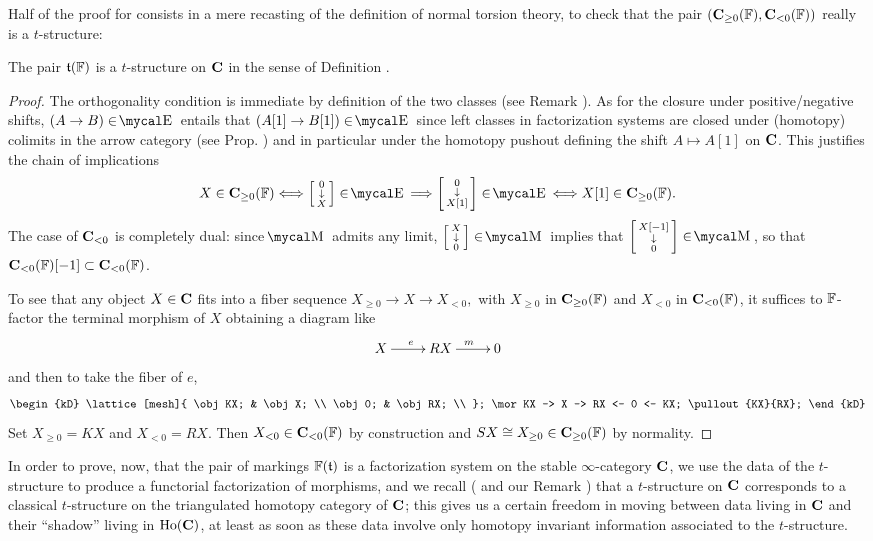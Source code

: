 Half of the proof for \athm {} consists in a mere recasting of the definition of normal torsion theory, to check that the pair $(\textbf{C}_{\ge 0}(\mathbb{F}),\textbf{C}_{<0}(\mathbb{F}))$ really is a $t$\hyp{}structure:
\begin{proposition}
The pair $\mathfrak{t}(\mathbb{F})$ is a $t$\hyp{}structure on $\textbf{C}$ in the sense of Definition .
\end{proposition}
\begin{proof}
The orthogonality condition is immediate by definition of the two classes (see Remark ). As for the closure under positive\fshyp{}negative shifts, $(A\to B)\in\EE$ entails that $(A[1]\to B[1])\in\EE$ since left classes in factorization systems are closed under (homotopy) colimits in the arrow category (see Prop. ) and in particular under the homotopy pushout defining the shift $A\mapsto A[1]$ on $\textbf{C}$. This justifies the chain of implications
\[
X\in \cate C_{\ge 0}(\fF)  \iff \var{0}{X}\in\EE 
 \Longrightarrow \var{0}{X[1]} \in\EE \iff X[1]\in \cate C_{\ge 0}(\fF) .
\]
The case of $\textbf{C}_{<0}$ is completely dual: since $\MM$ admits any limit, $\var{X}{0} \in\MM$ implies that $\var{X[-1]}{0} \in\MM$, so that $\textbf{C}_{<0}(\mathbb{F})[-1]\subset \textbf{C}_{<0}(\mathbb{F})$.

To see that any object $X\in \textbf{C}$ fits into a fiber sequence 
$
X_{\geq 0}\to X \to X_{<0},
$
with $X_{\geq 0}$ in $\textbf{C}_{\geq 0}(\mathbb{F})$ and $X_{< 0}$ in $\textbf{C}_{< 0}(\mathbb{F})$, 
it suffices to $\mathbb{F}$\hyp{}factor the terminal morphism of $X$ obtaining a diagram like
\[
\xymatrix{
X \ar[r]^e & RX \ar[r]^m & 0
}
\]
and then to take the fiber of $e$,
\[
\begin{kD}
\lattice[mesh]{
	\obj KX; & \obj X; \\
	\obj 0; & \obj RX; \\
};
\mor KX -> X -> RX <- 0 <- KX;
\pullout{KX}{RX};
\end{kD}
\]
Set $X_{\geq 0}=KX$ and $X_{<0}=RX$. Then $X_{<0}\in \textbf{C}_{<0}(\mathbb{F})$ by construction and $SX\cong X_{\geq 0}\in \textbf{C}_{\geq 0}(\mathbb{F})$ by normality.
\end{proof}
In order to prove, now, that the pair of markings $\mathbb{F}(\mathfrak{t})$ is a factorization system on the stable $\infty$\hyp{}category $\textbf{C}$, we use the data of the $t$\hyp{}structure to produce a functorial factorization of morphisms, and we recall (\cite[\adef \textbf{1.2.1.4}]{LurieHA} and our Remark ) that a $t$\hyp{}structure on $\textbf{C}$ corresponds to a classical $t$\hyp{}structure on the triangulated homotopy category of $\textbf{C}$; this gives us a certain freedom in moving between data living in $\textbf{C}$ and their ``shadow'' living in $\text{Ho}(\textbf{C})$, at least as soon as these data involve only homotopy invariant information associated to the $t$\hyp{}structure.

